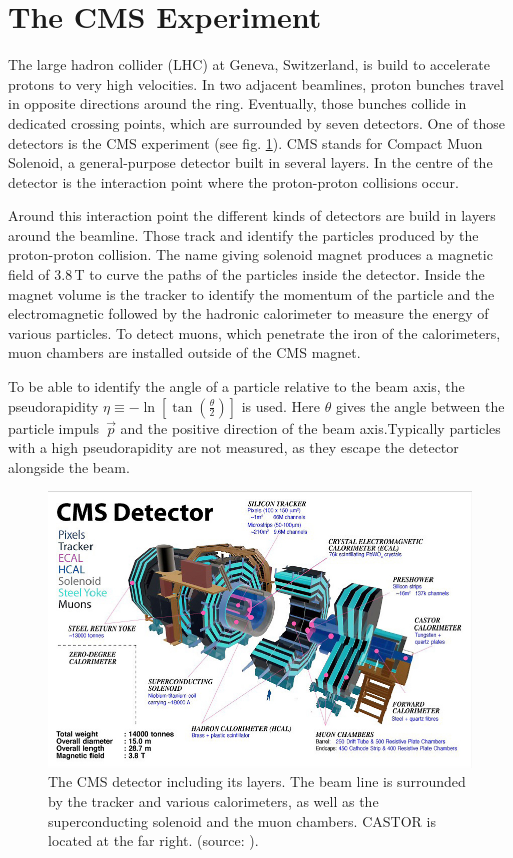 \section{The CMS Experiment}
The large hadron collider (LHC) at Geneva, Switzerland, is build to accelerate protons to very high velocities. In two adjacent beamlines, proton bunches travel in opposite directions around the ring. Eventually, those bunches collide in dedicated crossing points, which are surrounded by seven detectors. One of those detectors is the CMS experiment (see fig. \ref{cms}). CMS stands for Compact Muon Solenoid, a general-purpose detector built in several layers. In the centre of the detector is the interaction point where the proton-proton collisions occur.

Around this interaction point the different kinds of detectors are build in layers around the beamline. Those track and identify the particles produced by the proton-proton collision. The name giving solenoid magnet produces a magnetic field of 3.8\,T to curve the paths of the particles inside the detector. Inside the magnet volume is the tracker to identify the momentum of the particle and the electromagnetic followed by the hadronic calorimeter to measure the energy of various particles.  To detect muons, which penetrate the iron of the calorimeters, muon chambers are installed outside of the CMS magnet. \cite{CMS}

To be able to identify the angle of a particle relative to the beam axis, the pseudorapidity  ${\eta \equiv - \ln \left[ \tan \left( \frac{\theta}{2} \right) \right]}$ is used. Here $\theta$ gives the angle between the particle \mbox{impuls $\vec{p}$} and the positive direction of the beam axis.Typically particles with a high pseudorapidity are not measured, as they escape the detector alongside the beam. 
\begin{figure}
\centering
\includegraphics[scale=0.4]{cms_with_castor_drawing.jpg}
\caption{The CMS detector including its layers. The beam line is surrounded by the tracker and various calorimeters, as well as the superconducting solenoid and the muon chambers. CASTOR is located at the far right. (source: \cite{CMSbild}).}
\label{cms}
\end{figure}


